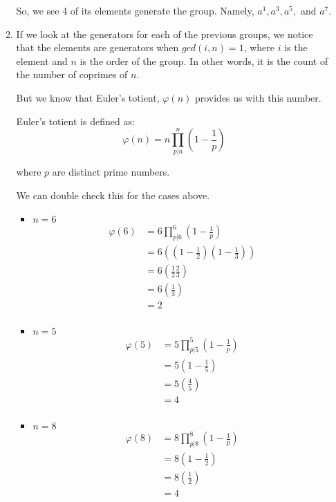 \documentclass[12pt,letterpaper]{article}
\begin{document}
\begin{enumerate}
\begin{enumerate}
          So, we see 4 of its elements generate the group.
          Namely, $a^1, a^3, a^5,$ and $a^7$.

        \item
          If we look at the generators for each of the previous groups,
          we notice that the elements are generators when $gcd(i, n) = 1$,
          where $i$ is the element and $n$ is the order of the group.
          In other words, it is the count of the number of coprimes of $n$.

          But we know that Euler's totient, $\varphi(n)$ provides us with this number.

          Euler's totient is defined as:
          \[\varphi(n) = n\prod_{p|n}^n\left(1-\frac{1}{p}\right)\]

          where $p$ are distinct prime numbers.

          We can double check this for the cases above.

          \begin{itemize}
            \item $n = 6$
              \begin{align*}
                \varphi(6) &= 6\prod_{p|6}^6\left(1-\frac{1}{p}\right) \\
                &= 6\left(\left(1-\frac{1}{2}\right)\left(1-\frac{1}{3}\right)\right) \\
                &= 6\left(\frac{1}{2}\frac{2}{3}\right) \\
                &= 6\left(\frac{1}{3}\right) \\
                &= 2 \\
              \end{align*}
            \item $n = 5$
              \begin{align*}
                \varphi(5) &= 5\prod_{p|5}^5\left(1-\frac{1}{p}\right) \\
                &= 5\left(1-\frac{1}{5}\right) \\
                &= 5\left(\frac{4}{5}\right) \\
                &= 4 \\
              \end{align*}
            \item $n = 8$
              \begin{align*}
                \varphi(8) &= 8\prod_{p|8}^8\left(1-\frac{1}{p}\right) \\
                &= 8\left(1-\frac{1}{2}\right) \\
                &= 8\left(\frac{1}{2}\right) \\
                &= 4 \\
              \end{align*}
          \end{itemize}


\end{enumerate}
\end{enumerate}
\end{document}
